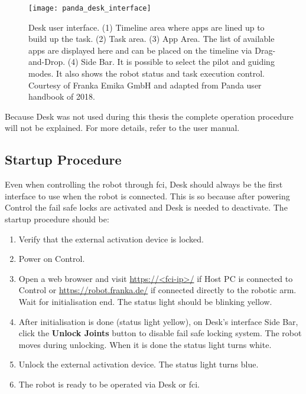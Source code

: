\begin{figure}[htbp]
    \centering
	\texttt{[image: panda\_desk\_interface]}
	\caption[Desk user interface.]{Desk user interface. (1) Timeline area where apps are lined up to build up the task. (2) Task area. (3) App Area. The list of available apps are displayed here and can be placed on the timeline via Drag-and-Drop. (4) Side Bar. It is possible to select the pilot and guiding modes. It also shows the robot status and task execution control. Courtesy of Franka Emika GmbH and adapted from Panda user handbook of 2018.}
	\label{fig:panda_desk_interface}
\end{figure}

Because Desk was not used during this thesis the complete operation procedure will not be explained. For more details, refer to the user manual.



\subsection{Startup Procedure}
\label{subsec:robotic_system_operation_startup}

Even when controlling the robot through \gls{fci}, Desk should always be the first interface to use when the robot is connected. This is so because after powering Control the fail safe locks are activated and Desk is needed to deactivate. The startup procedure should be:

\begin{enumerate}
    \item Verify that the external activation device is locked.
    \item Power on Control.
    \item Open a web browser and visit \url{https://<fci-ip>/} if Host PC is connected to Control or \url{https://robot.franka.de/} if connected directly to the robotic arm. Wait for initialisation end. The status light should be blinking yellow.
    \item After initialisation is done (status light yellow), on Desk's interface Side Bar, click the \textbf{Unlock Joints} button to disable fail safe locking system. The robot moves during unlocking. When it is done the status light turns white.
    \item Unlock the external activation device. The status light turns blue.
    \item The robot is ready to be operated via Desk or \gls{fci}.
\end{enumerate}

